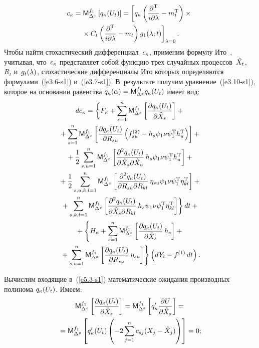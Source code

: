 \begin{multicols}{2}
\noindent
\begin{multline}
c_\kappa ={\sf M}_{\Delta^x}^{f_1} \left[ q_\kappa (U_t)\right] =
\left[ q_\kappa \left(\displaystyle\frac{\displaystyle \partial^{\mathrm{T}}\mathstrut}{\displaystyle i\partial \lambda \mathstrut}- 
m_t^{\mathrm{T}}\right)\times{}\right.\\
\left.{}\times C_t \left(\displaystyle\frac{\displaystyle \partial^{\mathrm{T}} \mathstrut}{\displaystyle i\partial \lambda\mathstrut} - 
m_t\right) g_1(\lambda;t)\right]_{\lambda=0}.
\label{e5.2-s1}
\end{multline}
Чтобы найти стохастический дифференциал~$c_\kappa$, применим формулу
Ито~\cite{5-s1}, учитывая, что~$c_\kappa$ представляет собой функцию
трех случайных процессов~${\hat X}_t$, $R_t$ и~$g_t(\lambda)$,
стохастические дифференциалы Ито которых определяются 
формулами~(\ref{e3.6-s1}) и~(\ref{e3.7-s1}). В~результате получим уравнение~(\ref{e3.10-s1}), 
которое на основании равенства  $q_\kkk (\alp) \hm = 
\mm_{\Delta^x}^{f_1} q_\kkk (U_t)$ имеет вид:
    \begin{multline}
    dc_\kappa=\biggl\{ F_\kappa
    +\sum\limits_{s=1}^n {\sf M}_{\Delta^x}^{f_1}\left[\displaystyle\frac{\displaystyle \partial q_\kappa (U_t)\mathstrut}{\displaystyle \partial {\hat X}_s\mathstrut}\right]
    +{}\\
    {}+\sum\limits_{s=1}^n {\sf M}_{\Delta^x}^{f_1}\left[ 
    \displaystyle\frac{\displaystyle \partial q_\kappa (U_t)\mathstrut}{\displaystyle \partial R_{su}\mathstrut}\left(
    f_{su}^{(2)} - h_s \psi_1\nu\psi_1^{\mathrm{T}} h_u^{\mathrm{T}}\right)\right]+{}\\
{}+\displaystyle\frac{\displaystyle 1\mathstrut}{\displaystyle 2\mathstrut}\sum\limits_{s,u=1}^n {\sf M}_{\Delta^x}^{f_1}\left[
\displaystyle\frac{\displaystyle \partial^2 q_\kappa (U_t)\mathstrut}{\displaystyle \partial {\hat X}_s \partial {\hat X}_u\mathstrut}\,h_s
    \psi_1\nu\psi_1^{\mathrm{T}}  h_u^{\mathrm{T}}\right]
    +{}\\
    {}+\displaystyle\frac{\displaystyle 1\mathstrut}{\displaystyle 2\mathstrut}\sum\limits_{s,u,k,l=1}^n {\sf M}_{\Delta^x}^{f_1}\left[ 
    \displaystyle\frac{\displaystyle \partial^2 q_\kappa (U_t)\mathstrut}{\displaystyle \partial R_{su}\partial R_{kl}\mathstrut}
\,\eta_{su}  \psi_1\nu\psi_1^{\mathrm{T}}  \eta_{kl}^{\mathrm{T}} \right]+{}\\
{}+\sum\limits_{s,k,l=1}^n {\sf M}_{\Delta^x}^{f_1}\left[ 
\displaystyle\frac{\displaystyle \partial^2 q_\kappa (U_t)\mathstrut}{\displaystyle  \partial {\hat X}_s \partial R_{kl}\mathstrut}\, h_s
    \psi_1\nu\psi_1^{\mathrm{T}}  \eta_{kl}^{\mathrm{T}}\right] \biggr\} \,dt+{}\\
{}+ \left\{ H_\kappa +\sum\limits_{s=1}^n {\sf M}_{\Delta^x}^{f_1}\left[
\displaystyle\frac{\displaystyle \partial q_\kappa (U_t)\mathstrut}{\displaystyle \partial {\hat X}_s \mathstrut}\,h_s\right]
    +{}\right.\\
   \left. {}+\sum\limits_{s,u=1}^n {\sf M}_{\Delta^x}^{f_1}\left[ 
    \displaystyle\frac{\displaystyle \partial q_\kappa (U_t)\mathstrut}{\displaystyle \partial R_{su} \mathstrut}\,\eta_{su}\right]\right\} 
    \left(dY_t - f^{(1)} \,dt\right).
    \label{e5.3-s1}
    \end{multline}

Вычислим входящие в~(\ref{e5.3-s1})
математические ожидания производных полинома $q_\kappa(U_t)$. Имеем:
\begin{multline}
{\sf M}_{\Delta^x}^{f_1} \left[ \displaystyle\frac{\displaystyle \partial q_\kappa (U_t)\mathstrut}{\displaystyle \partial {\hat X}_s \mathstrut}\right]= 
{\sf M}_{\Delta^x}^{f_1}\left[
    q_\kappa'\displaystyle\frac{\displaystyle \partial U\mathstrut}{\displaystyle \partial {\hat X}_s \mathstrut} \right]= {}\\
    \!\!{}=
    {\sf M}_{\Delta^y}^{f_1}\left[ q_\kappa' (U_t) \left( - 2
    \sum\limits_{j=1}^n  c_{sj} (X_j - {\hat X}_j)\right)\right] =0;\!\label{e5.4-s1}
    \end{multline}
    

\end{multicols}
